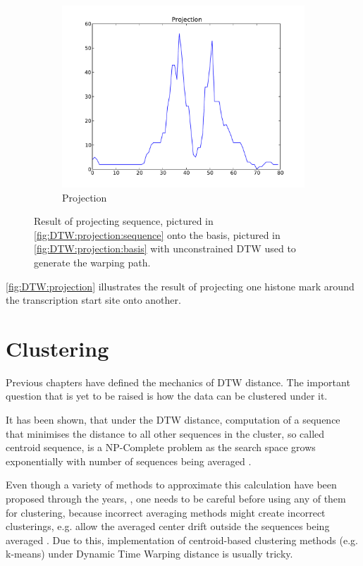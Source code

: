 \documentclass[parskip]{cs4rep}
\begin{document}
\begin{figure}[t,b]
\begin{subfigure}[b]{0.31\textwidth}
       \centering
       \includegraphics[width=\textwidth]{figures/DTW/projection.pdf}
       \caption{Projection}
       \label{fig:DTW:projection:projection}
   \end{subfigure}
   \caption{Result of projecting sequence, pictured in \ref{fig:DTW:projection:sequence} onto the basis, pictured in \ref{fig:DTW:projection:basis} with unconstrained DTW used to generate the warping path.}
   \label{fig:DTW:projection}
\end{figure}

\autoref{fig:DTW:projection} illustrates the result of projecting one histone mark around the transcription start site onto another.

\section{Clustering}
\label{sec:clustering}

Previous chapters have defined the mechanics of DTW distance. The important question that is yet to be raised is how the data can be clustered under it. 

It has been shown, that under the DTW distance, computation of a sequence that minimises the distance to all other sequences in the cluster, so called centroid sequence, is a NP-Complete problem as the search space grows exponentially with number of sequences being averaged \cite{Hautamaki:2008fh,Petitjean:2012bp}.

Even though a variety of methods to approximate this calculation have been proposed through the years, \cite{Gupta:1996tw,Niennattrakul:2009ep,Petitjean:2011bq,Petitjean:2012bp}, one needs to be careful before using any of them for clustering, because incorrect averaging methods might create incorrect clusterings, e.g. allow the averaged center drift outside the sequences being averaged \cite{Niennattrakul:2007wv}. Due to this, implementation of centroid-based clustering methods (e.g. k-means) under Dynamic Time Warping distance is usually tricky.
\end{document}

